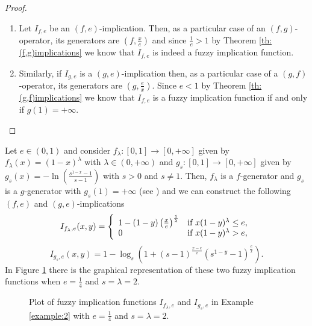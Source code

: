 \begin{proof} \hspace{0.5cm}
	\begin{enumerate}[label=(\roman*)]
		\item Let $I_{f,e}$ be an $(f,e)$-implication. Then, as a particular case of an $(f,g)$-operator, its generators are $(f, \frac{x}{e})$ and since $\frac{1}{e} >1$ by Theorem \ref{th:(f,g)implications} we know that $I_{f,e}$ is indeed a fuzzy implication function.
		\item Similarly, if $I_{g,e}$ is a $(g,e)$-implication then, as a particular case of a $(g,f)$-operator, its generators are $(g, \frac{e}{x})$. Since $e <1$ by Theorem \ref{th:(g,f)implications} we know that $I_{f,e}$ is a fuzzy implication function if and only if $g(1)=+\infty$. \qedhere
	\end{enumerate}
\end{proof}

\begin{example}\label{example:2}
	Let $e \in (0,1)$ and consider $f_\lambda:[0,1] \to [0,+\infty]$ given by $f_\lambda(x)=(1-x)^\lambda$ with $\lambda \in(0,+\infty)$ and $g_s:[0,1] \to [0,+\infty]$ given by $g_s(x)= - \ln \left(\frac{s^{1-x}-1}{s-1}\right)$ with $s>0$ and $s \not = 1$. Then, $f_\lambda$ is a $f$-generator and $g_s$ is a $g$-generator with $g_s(1)=+\infty$ (see \cite[Examples 3.1.3 and 3.2.4]{Baczynski2008}) and we can construct the following $(f,e)$ and $(g,e)$-implications
	\begin{equation}\label{eq:Example2-1}
		I_{f_\lambda,e}(x,y) = \left\{ \begin{array}{ll}
			1-(1-y)\left(\frac{x}{e}\right)^{\frac{1}{\lambda}} &   \hbox{if }  x(1-y)^\lambda \leq e, \\
			0 &  \hbox{if } x(1-y)^\lambda > e, 
		\end{array}
		\right.
	\end{equation}
	\begin{equation}\label{eq:Example2-2}
		I_{g_s,e}(x,y) = 1-\log_s \left(1+(s-1)^{\frac{x-e}{x}}(s^{1-y}-1)^{\frac{e}{x}}\right).
	\end{equation}
	In Figure \ref{figure:example2}  there is the graphical representation of these two fuzzy implication functions when $e= \frac{1}{4}$ and $s=\lambda=2$.
	\begin{figure}[t]
		\centering
		\caption[Plot of an $(f,e)$ and a $(g,e)$-implication]{Plot of fuzzy implication functions $I_{f_\lambda,e}$ and $I_{g_s,e}$ in Example \ref{example:2} with $e= \frac{1}{4}$ and $s=\lambda=2$.}\label{figure:example2}
	\end{figure}
\end{example}

